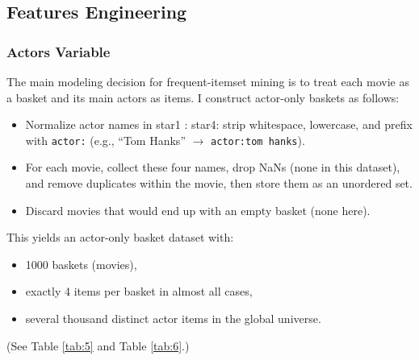 \documentclass{article}  %
\begin{document}
\FloatBarrier

\subsection{Features Engineering}

\subsubsection{Actors Variable}

The main modeling decision for frequent-itemset mining is to treat each movie as a basket and its main actors as items. I construct actor-only baskets as follows:
\begin{itemize}
    \item Normalize actor names in star1 : star4: strip whitespace, lowercase, and prefix with \verb|actor:| (e.g., ``Tom Hanks'' \(\rightarrow\) \verb|actor:tom hanks|).
    \item For each movie, collect these four names, drop NaNs (none in this dataset), and remove duplicates within the movie, then store them as an unordered set.
    \item Discard movies that would end up with an empty basket (none here).
\end{itemize}

This yields an actor-only basket dataset with:
\begin{itemize}
    \item 1000 baskets (movies),
    \item exactly 4 items per basket in almost all cases,
    \item several thousand distinct actor items in the global universe.
\end{itemize}
(See Table \ref{tab:5} and Table \ref{tab:6}.)
\end{document}
